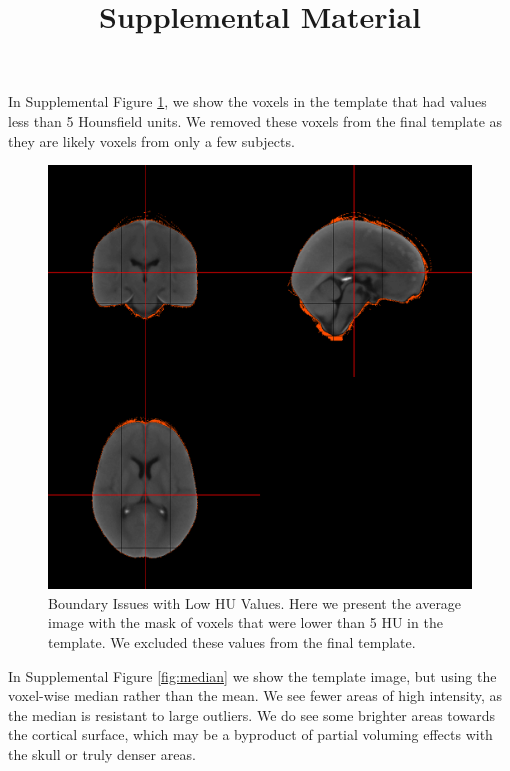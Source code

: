 \documentclass[
]{article}
\title{Supplemental Material}
\author{}
\date{\vspace{-2.5em}}
\begin{document}
\maketitle

In Supplemental Figure \ref{fig:boundary}, we show the voxels in the template that had values less than 5 Hounsfield units. We removed these voxels from the final template as they are likely voxels from only a few subjects.

\begin{figure}
\centering
\includegraphics{index_files/figure-latex/sd_image.pdf}
\caption{\label{fig:boundary}Boundary Issues with Low HU Values. Here we present the average image with the mask of voxels that were lower than 5 HU in the template. We excluded these values from the final template.}
\end{figure}

In Supplemental Figure \ref{fig:median} we show the template image, but using the voxel-wise median rather than the mean. We see fewer areas of high intensity, as the median is resistant to large outliers. We do see some brighter areas towards the cortical surface, which may be a byproduct of partial voluming effects with the skull or truly denser areas.
\end{document}
